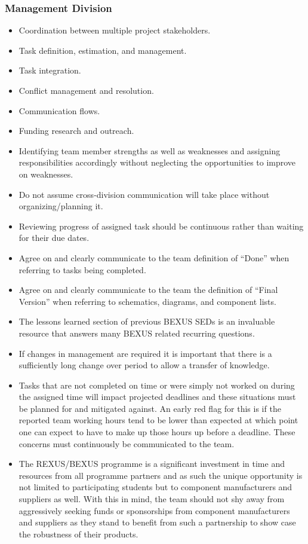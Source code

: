 \documentclass[a4paper,12pt,twoside]{article}
\begin{document}
\subsubsection{Management Division}

\begin{itemize}
    \item Coordination between multiple project stakeholders.
    \item Task definition, estimation, and management.
    \item Task integration.
    \item Conflict management and resolution.
    \item Communication flows.
    \item Funding research and outreach.
    \item Identifying team member strengths as well as weaknesses and assigning responsibilities accordingly without neglecting the opportunities to improve on weaknesses. 
    \item Do not assume cross-division communication will take place without organizing/planning it.
    \item Reviewing progress of assigned task should be continuous rather than waiting for their due dates.
    \item Agree on and clearly communicate to the team definition of \enquote{Done} when referring to tasks being completed.
    \item Agree on and clearly communicate to the team the definition of \enquote{Final Version} when referring to schematics, diagrams, and component lists.
    \item The lessons learned section of previous BEXUS SEDs is an invaluable resource that answers many BEXUS related recurring questions.
    \item If changes in management are required it is important that there is a sufficiently long change over period to allow a transfer of knowledge.
    \item Tasks that are not completed on time or were simply not worked on during the assigned time will impact projected deadlines and these situations must be planned for and mitigated against. An early red flag for this is if the reported team working hours tend to be lower than expected at which point one can expect to have to make up those hours up before a deadline. These concerns must continuously be communicated to the team.
    \item The REXUS/BEXUS programme is a significant investment in time and resources from all programme partners and as such the unique opportunity is not limited to participating students but to component manufacturers and suppliers as well. With this in mind, the team should not shy away from aggressively seeking funds or sponsorships from component manufacturers and suppliers as they stand to benefit from such a partnership to show case the robustness of their products. 
\end{itemize}
\end{document}
